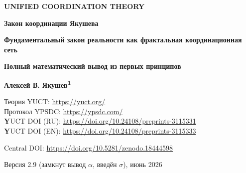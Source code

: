 \documentclass[12pt,a4paper]{article}
\theoremstyle{remark}
\begin{document}
	
	\begin{titlepage}
		\centering
		\vspace*{2cm}
		{\Huge\bfseries UNIFIED COORDINATION THEORY\par}
		\vspace*{2cm}
		{\Huge\bfseries Закон координации Якушева\par}
		\vspace{0.5cm}
		{\Large\bfseries Фундаментальный закон реальности как фрактальная координационная сеть\par}
		\vspace{0.3cm}
		{\Large\bfseries Полный математический вывод из первых принципов\par}
		
	
		\vspace{1.0cm}
		
		\Large\textbf{Алексей В. Якушев\textsuperscript{1}}
		
		Теория YUCT: \url{https://yuct.org/}\\
		Протокол YPSDC: \url{https://ypsdc.com/}\\
		
		\vspace{2cm}
		\large 
		\textbf YUCT DOI (RU): \url{https://doi.org/10.24108/preprints-3115331} \\
		\textbf YUCT DOI (EN): \url{https://doi.org/10.24108/preprints-3115333}
		
		\vspace{1cm}
		
		\vspace{0cm}
		
		Central DOI: \url{https://doi.org/10.5281/zenodo.18444598}\\
		
		\vspace{1.0cm}
		{\normalsize Версия 2.9 (замкнут вывод $\alpha$, введён $\sigma$), июнь 2026\par}
		

\end{titlepage}
\end{document}
